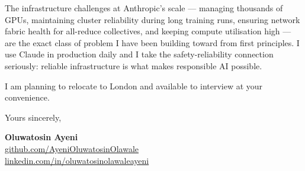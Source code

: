 \documentclass[11pt,a4paper]{article}
\begin{document}
The infrastructure challenges at Anthropic's scale — managing thousands of GPUs, maintaining cluster reliability during long training runs, ensuring network fabric health for all-reduce collectives, and keeping compute utilisation high — are the exact class of problem I have been building toward from first principles. I use Claude in production daily and I take the safety-reliability connection seriously: reliable infrastructure is what makes responsible AI possible.

I am planning to relocate to London and available to interview at your convenience.

Yours sincerely,

\textbf{Oluwatosin Ayeni}\\
\href{https://github.com/AyeniOluwatosinOlawale}{github.com/AyeniOluwatosinOlawale}\\
\href{https://www.linkedin.com/in/oluwatosinolawaleayeni/}{linkedin.com/in/oluwatosinolawaleayeni}
\end{document}
